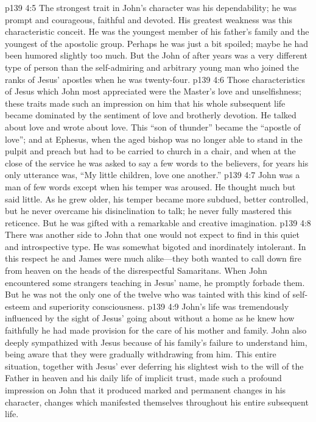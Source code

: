 \vs p139 4:5 The strongest trait in John’s character was his dependability; he was prompt and courageous, faithful and devoted. His greatest weakness was this characteristic conceit. He was the youngest member of his father’s family and the youngest of the apostolic group. Perhaps he was just a bit spoiled; maybe he had been humored slightly too much. But the John of after years was a very different type of person than the self\hyp{}admiring and arbitrary young man who joined the ranks of Jesus’ apostles when he was twenty\hyp{}four.\plusone
\pc \vs p139 4:6 Those characteristics of Jesus which John most appreciated were the Master’s love and unselfishness; these traits made such an impression on him that his whole subsequent life became dominated by the sentiment of love and brotherly devotion. He talked about love and wrote about love. This “son of thunder” became the “apostle of love”; and at Ephesus, when the aged bishop was no longer able to stand in the pulpit and preach but had to be carried to church in a chair, and when at the close of the service he was asked to say a few words to the believers, for years his only utterance was, “My little children, love one another.”
\pc \vs p139 4:7 John was a man of few words except when his temper was aroused. He thought much but said little. As he grew older, his temper became more subdued, better controlled, but he never overcame his disinclination to talk; he never fully mastered this reticence. But he was gifted with a remarkable and creative imagination.
\pc \vs p139 4:8 There was another side to John that one would not expect to find in this quiet and introspective type. He was somewhat bigoted and inordinately intolerant. In this respect he and James were much alike---they both wanted to call down fire from heaven on the heads of the disrespectful Samaritans. When John encountered some strangers teaching in Jesus’ name, he promptly forbade them. But he was not the only one of the twelve who was tainted with this kind of self\hyp{}esteem and superiority consciousness.
\vs p139 4:9 John’s life was tremendously influenced by the sight of Jesus’ going about without a home as he knew how faithfully he had made provision for the care of his mother and family. John also deeply sympathized with Jesus because of his family’s failure to understand him, being aware that they were gradually withdrawing from him. This entire situation, together with Jesus’ ever deferring his slightest wish to the will of the Father in heaven and his daily life of implicit trust, made such a profound impression on John that it produced marked and permanent changes in his character, changes which manifested themselves throughout his entire subsequent life.\plusone
